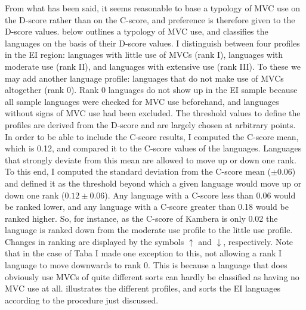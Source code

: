 From what has been said, it seems reasonable to base a typology of MVC use on the D-score rather than on the C-score, and preference is therefore given to the D-score values.  below outlines a typology of MVC use, and classifies the languages on the basis of their D-score values. I distinguish between four profiles in the EI region: languages with little use of MVCs (rank I), languages with moderate use (rank II), and languages with extensive use (rank III). To these we may add another language profile: languages that do not make use of MVCs altogether (rank 0). Rank 0 languages do not show up in the EI sample because all sample languages were checked for MVC use beforehand, and languages without signs of MVC use had been excluded. The threshold values to define the profiles are derived from the D-score and are largely chosen at arbitrary points. In order to be able to include the C-score results, I computed the C-score mean, which is 0.12, and compared it to the C-score values of the languages. Languages that strongly deviate from this mean are allowed to move up or down one rank. To this end, I computed the standard deviation from the C-score mean ($\pm 0.06$) and defined it as the threshold beyond which a given language would move up or down one rank ($0.12 \pm 0.06$). Any language with a C-score less than 0.06 would be ranked lower, and any language with a C-score greater than 0.18 would be ranked higher. So, for instance, as the C-score of Kambera is only 0.02 the language is ranked down from the moderate use profile to the little use profile. Changes in ranking are displayed by the symbols $\uparrow$ and $\downarrow$, respectively. Note that in the case of Taba I made one exception to this, not allowing a rank I language to move downwards to rank 0. This is because a language that does obviously use MVCs of quite different sorts can hardly be classified as having no MVC use at all.  illustrates the different profiles, and sorts the EI languages according to the procedure just discussed.

